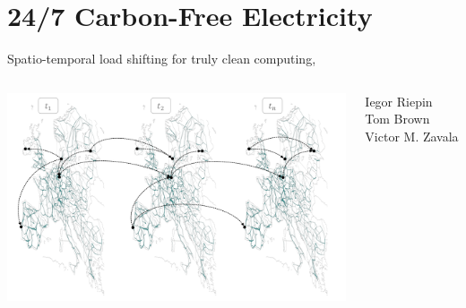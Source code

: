 \section{24/7 Carbon-Free Electricity}


\begin{frame}{Spatio-temporal load shifting for truly clean computing}, 
  

	\begin{columns}[T]
		\begin{column}{10cm}

		\includegraphics[width=10cm]{images/spatial-temporal-vlinks-cropped.png}

	  \end{column}
	  \begin{column}{4cm}
			
		Iegor Riepin \\
		Tom Brown \\
		Victor M. Zavala \\

	  \\


	  \end{column}
	\end{columns}
\end{frame}
  

